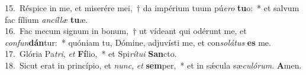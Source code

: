 {15.~}Réspice in me, et miserére mei,~† da impérium tuum pú\textit{e}\textit{ro} \textbf{tu}o:~* et salvum fac fílium \textit{an}\textit{cíl}\textit{læ} \textbf{tu}æ.\\
{16.~}Fac mecum signum in bonum,~† ut vídeant qui odérunt me, et \textit{con}\textit{fun}\textbf{dán}tur:~* quóniam tu, Dómine, adjuvísti me, et con\textit{so}\textit{lá}\textit{tus} \textbf{es} me.\\
{17.~}Glória Pa\textit{tri}, \textit{et} \textbf{Fí}lio,~* et Spi\textit{rí}\textit{tu}\textit{i} \textbf{San}cto.\\
{18.~}Sicut erat in princípio, et \textit{nunc}, \textit{et} \textbf{sem}per,~* et in sǽcula sæ\textit{cu}\textit{ló}\textit{rum}. \textbf{A}men.\\

